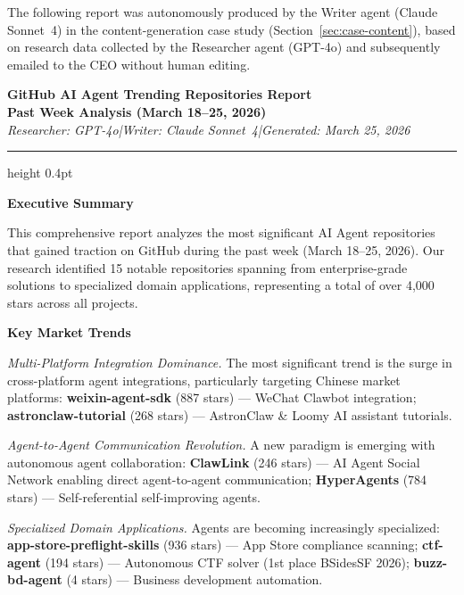 The following report was autonomously produced by the Writer agent (Claude Sonnet~4)
in the content-generation case study (Section~\ref{sec:case-content}), based on
research data collected by the Researcher agent (GPT-4o) and subsequently emailed
to the CEO without human editing.

\begin{mdframed}[
  linewidth=0.8pt,
  linecolor=black!40,
  backgroundcolor=black!2,
  innertopmargin=16pt,
  innerbottommargin=16pt,
  innerleftmargin=18pt,
  innerrightmargin=18pt,
  roundcorner=4pt
]
\sloppy
{\centering
  {\large\bfseries GitHub AI Agent Trending Repositories Report}\\[4pt]
  {\normalsize\bfseries Past Week Analysis (March 18--25, 2026)}\\[2pt]
  \textit{\small Researcher: GPT-4o\quad|\quad Writer: Claude Sonnet~4\quad|\quad Generated: March 25, 2026}
\par}

\vspace{8pt}
\hrule height 0.4pt
\vspace{10pt}

\noindent\textbf{Executive Summary}

\noindent
This comprehensive report analyzes the most significant AI Agent repositories that gained traction on GitHub during the past week (March 18--25, 2026). Our research identified 15 notable repositories spanning from enterprise-grade solutions to specialized domain applications, representing a total of over 4,000 stars across all projects.

\vspace{8pt}
\noindent\textbf{Key Market Trends}

\noindent\textit{Multi-Platform Integration Dominance.}\quad
The most significant trend is the surge in cross-platform agent integrations, particularly targeting Chinese market platforms: \textbf{weixin-agent-sdk} (887 stars) --- WeChat Clawbot integration; \textbf{astronclaw-tutorial} (268 stars) --- AstronClaw \& Loomy AI assistant tutorials.

\vspace{4pt}
\noindent\textit{Agent-to-Agent Communication Revolution.}\quad
A new paradigm is emerging with autonomous agent collaboration: \textbf{ClawLink} (246 stars) --- AI Agent Social Network enabling direct agent-to-agent communication; \textbf{HyperAgents} (784 stars) --- Self-referential self-improving agents.

\vspace{4pt}
\noindent\textit{Specialized Domain Applications.}\quad
Agents are becoming increasingly specialized: \textbf{app-store-preflight-skills} (936 stars) --- App Store compliance scanning; \textbf{ctf-agent} (194 stars) --- Autonomous CTF solver (1st place BSidesSF 2026); \textbf{buzz-bd-agent} (4 stars) --- Business development automation.


\end{mdframed}

